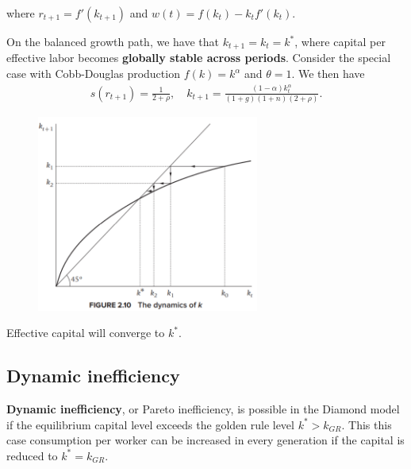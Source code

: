 \documentclass[../main.tex]{subfiles}
\begin{document}
        where $r_{t+1} = f'(k_{t+1})$ and $w(t) = f(k_t) - k_t f'(k_t)$.
        
        \vspace{0.5cm}
        
        On the balanced growth path, we have that $k_{t+1} = k_t = k^*$, where capital per effective labor becomes \textbf{globally stable across periods}. Consider the special case with Cobb-Douglas production $f(k) = k^\alpha$ and $\theta = 1$. We then have
        \begin{align}
            s(r_{t+1}) = \frac{1}{2+\rho}, \quad
            k_{t+1} = \frac{
                (1-\alpha) k_t^\alpha
            }{
                (1+g)(1+n)(2+\rho)
            }.
        \end{align}
        
        \begin{figure}[!ht]
            \centering
            \includegraphics[width=0.65\textwidth]{subfile/attachments/2.3-diamond-k-evo.png}
        \end{figure}
        
        Effective capital will converge to $k^*$.
        
    \subsection{Dynamic inefficiency}
    
        \textbf{Dynamic inefficiency}, or Pareto inefficiency, is possible in the Diamond model if the equilibrium capital level exceeds the golden rule level $k^* > k_{GR}$. This this case consumption per worker can be increased in every generation if the capital is reduced to $k^* = k_{GR}$.
        
\end{document}
